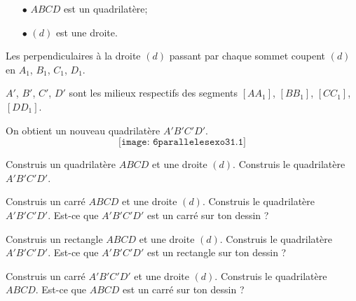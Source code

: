 \begin{itemize}
\item[$\bullet$] $ABCD$ est un quadrilatère;
\item[$\bullet$] $(d)$ est une droite.
\end{itemize}
Les perpendiculaires à la droite $(d)$ passant par chaque sommet
coupent $(d)$ en $A_1$, $B_1$, $C_1$, $D_1$.
\par $A'$, $B'$, $C'$, $D'$ sont les milieux respectifs des segments
$[AA_1]$, $[BB_1]$, $[CC_1]$, $[DD_1]$.
\par On obtient un nouveau quadrilatère $A'B'C'D'$.
\[\texttt{[image: 6parallelesexo31.1]}\]
\begin{myenumerate}
  \item Construis un quadrilatère $ABCD$ et une droite
    $(d)$. Construis le quadrilatère $A'B'C'D'$.
  \item Construis un carré $ABCD$ et une droite
    $(d)$. Construis le quadrilatère $A'B'C'D'$. Est-ce que $A'B'C'D'$ est
    un carré sur ton dessin ?
  \item Construis un rectangle $ABCD$ et une droite
    $(d)$. Construis le quadrilatère $A'B'C'D'$. Est-ce que $A'B'C'D'$ est
    un rectangle sur ton dessin ?
  \item Construis un carré $A'B'C'D'$ et une droite
    $(d)$. Construis le quadrilatère $ABCD$. Est-ce que $ABCD$ est
    un carré sur ton dessin ?

\end{myenumerate}